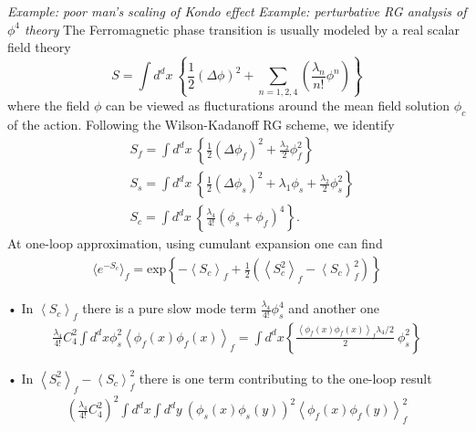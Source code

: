 \documentclass[submission, PhysLectNotes]{SciPost}
\newcommand{\ExOp}[1]{\left\langle#1\right\rangle}
\begin{document}
{\it Example: poor man's scaling of Kondo effect}
{\it Example: perturbative RG analysis of $\phi^4$ theory}
The Ferromagnetic phase transition is usually modeled by a real scalar field theory
\begin{equation}
S = \int d^dx \ \left\{\frac{1}{2}\left(\Delta\phi\right)^2 + \sum_{n=1,2,4}\left(\frac{\lambda_n}{n!}\phi^n\right) \right\}
\end{equation}
where the field $\phi$ can be viewed as flucturations around the mean field solution $\phi_c$ of the action. Following the Wilson-Kadanoff RG scheme, we identify
\begin{equation}
\begin{aligned}
&S_f = \int d^dx \ \left\{\frac{1}{2}\left(\Delta\phi_f\right)^2 + \frac{\lambda_2}{2}\phi_f^2 \right\} \\
&S_s = \int d^dx \ \left\{\frac{1}{2}\left(\Delta\phi_s\right)^2 + \lambda_1 \phi_s + \frac{\lambda_2}{2}\phi_s^2 \right\} \\
&S_c = \int d^dx \ \left\{ \frac{\lambda_4}{4!}\left(\phi_s + \phi_f\right)^4 \right\}.
\end{aligned}
\end{equation}
At one-loop approximation, using cumulant expansion one can find
\begin{equation}
\begin{aligned}
\langle e^{-S_c} \rangle_f = \mathrm{exp}\left\{{-\ExOp{S_c}_f + \frac{1}{2}\left( \ExOp{S_c^2}_f - \ExOp{S_c}_f^2\right)}\right\}
\end{aligned}
\end{equation}%

• In $\ExOp{S_c}_f$ there is a pure slow mode term $\frac{\lambda_4}{4!}\phi_s^4$ and another one
\begin{equation}
\begin{aligned}
\frac{\lambda_4}{4!} C^2_4 \int d^dx  \phi_s^2 \ExOp{\phi_f(x)\phi_f(x)}_f = \int d^dx \left\{ \frac{\ExOp{\phi_f(x)\phi_f(x)}_f\lambda_4/2}{2}\ \phi_s^2\right\}
\end{aligned}
\end{equation}

• In $\ExOp{S_c^2}_f - \ExOp{S_c}_f^2$ there is one term contributing to the one-loop result
\begin{equation}
\begin{aligned}
\left( \frac{\lambda_4}{4!} C^2_4 \right)^2 \int d^dx \int d^dy \ \left(\phi_s(x)\phi_s(y)\right)^2 \ExOp{\phi_f(x) \phi_f(y)}_f^2
\end{aligned}
\end{equation}
 
\end{document}
